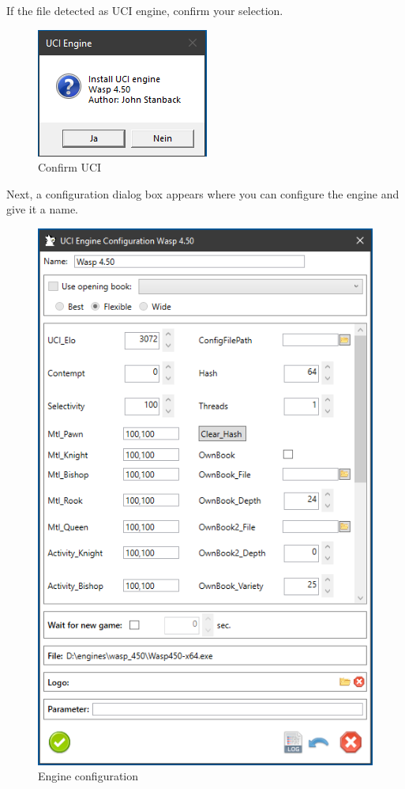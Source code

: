 \documentclass[11pt,a4paper]{article}
\begin{document}
	If the file detected as UCI engine, confirm your selection.\\
	\begin{figure}[H]
		\centering
		\includegraphics[scale=1.0]{uciConfirm.png}
		\caption{Confirm UCI}
		\label{fig:uciConfirm}
	\end{figure}
	Next, a configuration dialog box appears where you can configure the engine and give it a name.
	\begin{figure}[H]
		\centering
		\includegraphics[scale=0.9]{ConfigureWasp.png}
		\caption{Engine configuration}
		\label{fig:ConfigurWasp}
	\end{figure}
\end{document}
